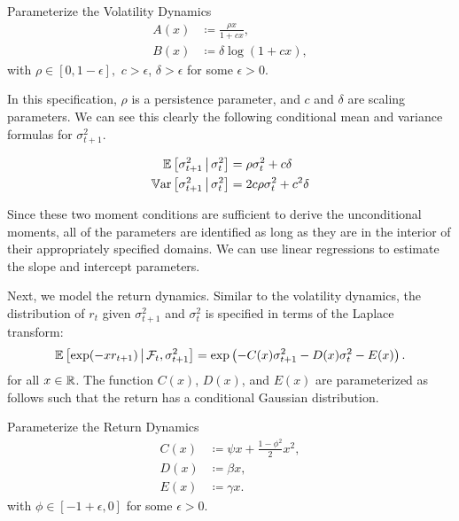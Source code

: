 \documentclass[11pt, letterpaper, twoside]{article}
\begin{document}
\begin{definition}{Parameterize the Volatility Dynamics}
     \label{defn:physical_vol_dynamics}
     \begin{align}
        \label{defn:a_PP}
        A(x) &\coloneqq \frac{\rho x}{1 + c x}, \\
        \label{defn:b_PP}
        B(x) &\coloneqq \delta \log(1 + c x),
     \end{align}
with $\rho \in [0,1-\epsilon],$ $c > \epsilon$, $\delta > \epsilon$ for some $\epsilon > 0$.
\end{definition}

In this specification, $\rho$ is a persistence parameter, and $c$ and $\delta$ are scaling parameters. We can see this clearly the following conditional mean and variance formulas for $\sigma^2_{t+1}$.

\begin{remark} 
 \label{remark:vol_moment_conditions}
    \begin{align}
        \E\left[\sigma^2_{t+1} \mvert \sigma^2_t \right] &= \rho \sigma^2_t + c \delta\\
%   
        \Var\left[\sigma^2_{t+1} \mvert \sigma^2_t \right] &= 2 c \rho \sigma^2_t + c^2 \delta 
%   
    \end{align}
\end{remark}

Since these two moment conditions are sufficient to derive the unconditional moments, all of the parameters are identified as long as they are in the interior of their appropriately specified domains. We can use linear regressions to estimate the slope and intercept parameters.

Next, we model the return dynamics. Similar to the volatility dynamics, the distribution of $r_t$ given $\sigma^2_{t+1}$ and $\sigma^2_{t}$ is specified in terms of the Laplace transform:
%
\begin{equation}
    \label{eqn:return_laplace_transform}
    \operatorname{\mathbb{E}}\left[\exp(- x r_{t+1}) \,\middle\vert\, \mathcal{F}_{t}, \sigma^2_{t+1} \right] = \exp\left(- C(x) \sigma^2_{t+1} - D(x) \sigma^2_t - E(x)\right).
\end{equation}
%
for all $x \in \mathbb{R}$. The function $C(x)$, $D(x)$, and $E(x)$ are parameterized as follows such that the return has a conditional Gaussian distribution.

\begin{definition}{Parameterize the Return Dynamics}
    \label{defn:physical_return_dynamics}
    \begin{align}
        C(x) &\coloneqq \psi x + \frac{1 - \phi^2}{2} x^2,\\
        D(x) &\coloneqq \beta x, \\
        E(x) &\coloneqq \gamma x.
    \end{align}
with $\phi \in [-1+\epsilon, 0]$ for some $\epsilon>0$.
\end{definition}
\end{document}
